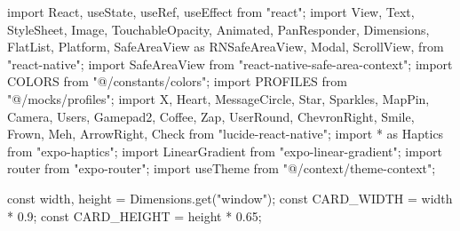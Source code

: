 import React, { useState, useRef, useEffect } from "react";
import {
  View,
  Text,
  StyleSheet,
  Image,
  TouchableOpacity,
  Animated,
  PanResponder,
  Dimensions,
  FlatList,
  Platform,
  SafeAreaView as RNSafeAreaView,
  Modal,
  ScrollView,
} from "react-native";
import { SafeAreaView } from "react-native-safe-area-context";
import { COLORS } from "@/constants/colors";
import { PROFILES } from "@/mocks/profiles";
import { 
  X, 
  Heart, 
  MessageCircle, 
  Star, 
  Sparkles,
  MapPin,
  Camera,
  Users,
  Gamepad2,
  Coffee,
  Zap,
  UserRound,
  ChevronRight,
  Smile,
  Frown,
  Meh,
  ArrowRight,
  Check
} from "lucide-react-native";
import * as Haptics from "expo-haptics";
import { LinearGradient } from "expo-linear-gradient";
import { router } from "expo-router";
import { useTheme } from "@/context/theme-context";

const { width, height } = Dimensions.get("window");
const CARD_WIDTH = width * 0.9;
const CARD_HEIGHT = height * 0.65;

